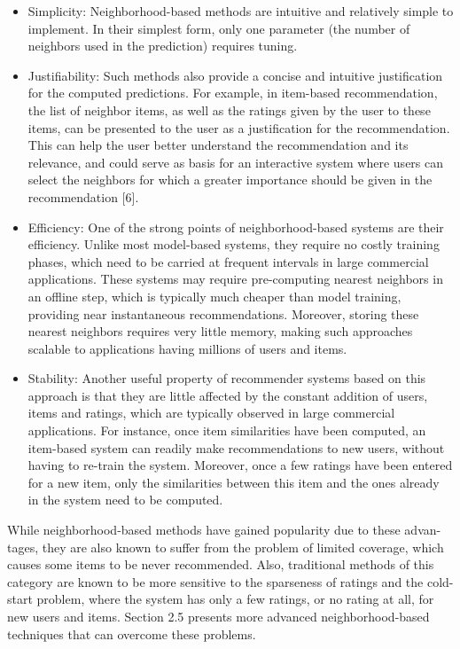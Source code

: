 \begin{itemize}
	\item Simplicity: Neighborhood-based methods are intuitive and relatively simple to implement. In their simplest form, only one parameter (the number of neighbors used in the prediction) requires tuning.
	\item  Justifiability: Such methods also provide a concise and intuitive justification for the computed predictions. For example, in item-based recommendation, the list of neighbor items, as well as the ratings given by the user to these items, can be presented to the user as a justification for the recommendation. This can help the user better understand the recommendation and its relevance, and could serve as basis for an interactive system where users can select the neighbors for which a greater importance should be given in the recommendation [6].
	\item Efficiency: One of the strong points of neighborhood-based systems are their efficiency. Unlike most model-based systems, they require no costly training phases, which need to be carried at frequent intervals in large commercial applications. These systems may require pre-computing nearest neighbors in an offline step, which is typically much cheaper than model training, providing near instantaneous recommendations. Moreover, storing these nearest neighbors requires very little memory, making such approaches scalable to applications having millions of users and items.
	\item Stability: Another useful property of recommender systems based on this approach is that they are little affected by the constant addition of users, items and ratings, which are typically observed in large commercial applications. For instance, once item similarities have been computed, an item-based system can readily make recommendations to new users, without having to re-train the system. Moreover, once a few ratings have been entered for a new item, only the similarities between this item and the ones already in the system need to be computed.
\end{itemize}

While neighborhood-based methods have gained popularity due to these advan- tages, they are also known to suffer from the problem of limited coverage, which causes some items to be never recommended. Also, traditional methods of this category are known to be more sensitive to the sparseness of ratings and the cold-start problem, where the system has only a few ratings, or no rating at all, for new users and items. Section 2.5 presents more advanced neighborhood-based techniques that can overcome these problems.

